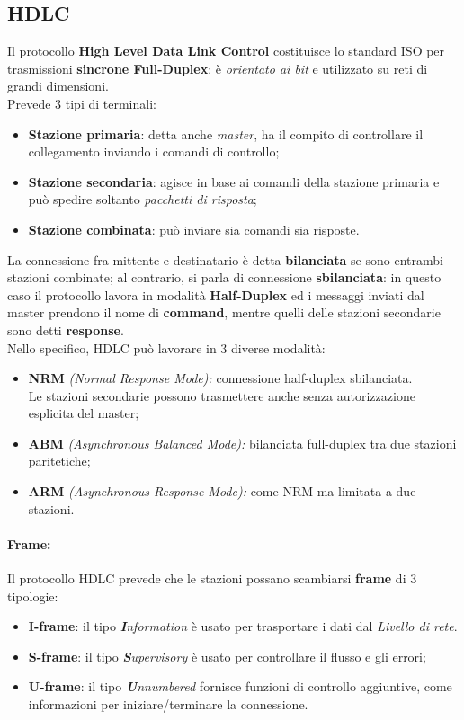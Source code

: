 \documentclass[a4paper,11pt]{article}
\def\para#1{\paragraph{#1}\label{#1}}
\def\italic#1{\textit{#1}}
\begin{document}
\subsection{HDLC}Il protocollo \textbf{High Level Data Link Control} costituisce lo standard ISO per trasmissioni \textbf{sincrone Full-Duplex}; è \textit{orientato ai bit }e utilizzato su reti di grandi dimensioni.
\\Prevede 3 tipi di terminali:
\begin{itemize}
	\item \textbf{Stazione primaria}: detta anche \italic{master}, ha il compito di controllare il collegamento inviando i comandi di controllo;
	\item \textbf{Stazione secondaria}: agisce in base ai comandi della stazione primaria e può spedire soltanto \textit{pacchetti di risposta};
	\item \textbf{Stazione combinata}: può inviare sia comandi sia risposte.
\end{itemize}
La connessione fra mittente e destinatario è detta \textbf{bilanciata} se sono entrambi stazioni combinate; al contrario, si parla di connessione \textbf{sbilanciata}: in questo caso il protocollo lavora in modalità \textbf{Half-Duplex} ed i messaggi inviati dal master prendono il nome di \textbf{command}, mentre quelli delle stazioni secondarie sono detti \textbf{response}.
\\Nello specifico, HDLC può lavorare in 3 diverse modalità:
\begin{itemize}
	\item \textbf{NRM} \textit{(Normal Response Mode): }connessione half-duplex sbilanciata.
	\\Le stazioni secondarie possono trasmettere anche senza autorizzazione esplicita del master;
	\item \textbf{ABM} \textit{(Asynchronous Balanced Mode): }bilanciata full-duplex tra due stazioni paritetiche;
	\item \textbf{ARM} \textit{(Asynchronous Response Mode): }come NRM ma limitata a due stazioni.
\end{itemize}
\para{Frame:}
Il protocollo HDLC prevede che le stazioni possano scambiarsi \textbf{frame} di 3 tipologie:
\begin{itemize}
	\item \textbf{I-frame}: il tipo \italic{\textbf{I}nformation} è usato per trasportare i dati dal \textit{Livello di rete}. 	
	\item \textbf{S-frame}: il tipo \italic{\textbf{S}upervisory} è usato per controllare il flusso e gli errori;	
	\item \textbf{U-frame}: il tipo \italic{\textbf{U}nnumbered} fornisce funzioni di	controllo aggiuntive, come informazioni per iniziare/terminare la connessione.
\end{itemize}
\end{document}
